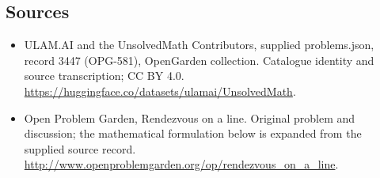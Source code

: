 \documentclass[11pt,a4paper]{article}
\begin{document}
\subsection{Sources}
\begin{itemize}
\item[S1] ULAM.AI and the UnsolvedMath Contributors, supplied problems.json, record 3447 (OPG-581), OpenGarden collection. Catalogue identity and source transcription; CC BY 4.0.
\url{https://huggingface.co/datasets/ulamai/UnsolvedMath}.
\item[S2] Open Problem Garden, Rendezvous on a line. Original problem and discussion; the mathematical formulation below is expanded from the supplied source record.
\url{http://www.openproblemgarden.org/op/rendezvous_on_a_line}.

\end{itemize}
\end{document}
